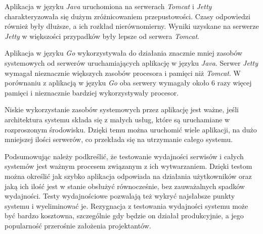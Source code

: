 Aplikacja w języku \textsl{Java} uruchomiona na serwerach \textsl{Tomcat} i \textsl{Jetty} charakteryzowała się dużym zróżnicowaniem przepustowości. Czasy odpowiedzi również były  dłuższe, a ich rozkład nierównomierny. Wyniki uzyskane na serwerze \textsl{Jetty} w większości przypadków były lepsze od serwera \textsl{Tomcat}. 

Aplikacja w języku \textsl{Go} wykorzystywała do działania znacznie mniej zasobów systemowych od serwerów uruchamiających aplikację  w języku \textsl{Java}. Serwer \textsl{Jetty} wymagał nieznacznie większych zasobów procesora i pamięci niż \textsl{Tomcat}. W porównaniu z aplikacją w języku \textsl{Go} oba serwery wymagały około 6 razy więcej pamięci i nieznacznie bardziej wykorzystywały procesor.

Niskie wykorzystanie zasobów systemowych przez aplikację jest ważne, jeśli architektura systemu składa się z małych usług, które są uruchamiane w rozproszonym środowisku. Dzięki temu można uruchomić wiele aplikacji, na dużo mniejszej ilości serwerów, co przekłada się na utrzymanie całego systemu. 

Podsumowując należy podkreślić, że testowanie wydajności serwisów i całych systemów jest ważnym procesem związanym z ich wytwarzaniem. Dzięki testom można określić jak szybko aplikacja odpowiada na działania użytkowników oraz jaką ich ilość jest w stanie obsłużyć równocześnie, bez zauważalnych spadków wydajności. Testy wydajnościowe pozwalają też wykryć najsłabsze punkty systemu i wyeliminować je.  Rezygnacja z testowania wydajności systemu może być bardzo kosztowna, szczególnie gdy będzie on działał produkcyjnie, a jego popularność przerośnie założenia projektantów.  

